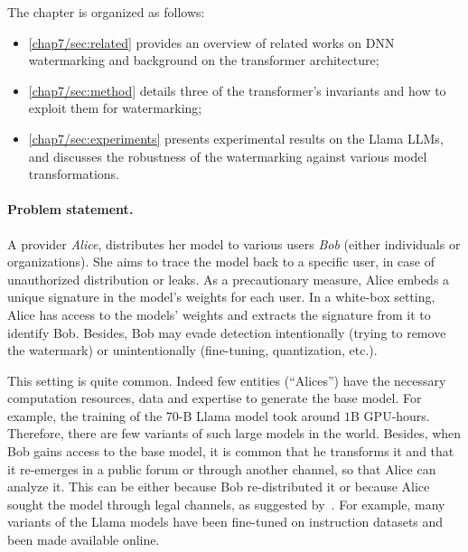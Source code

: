 The chapter is organized as follows:
\begin{itemize}
    \item 
    \autoref{chap7/sec:related} provides an overview of related works on DNN watermarking and background on the transformer architecture;
    \item
    \autoref{chap7/sec:method} details three of the transformer's invariants and how to exploit them for watermarking;
    \item
    \autoref{chap7/sec:experiments} presents experimental results on the Llama LLMs, and discusses the robustness of the watermarking against various model transformations.
\end{itemize}

\paragraph*{Problem statement.}
A provider \emph{Alice}, distributes her model to various users \emph{Bob} (either individuals or organizations).
She aims to trace the model back to a specific user, in case of unauthorized distribution or leaks. 
As a precautionary measure, Alice embeds a unique signature in the model's weights for each user. 
In a white-box setting, Alice has access to the models' weights and extracts the signature from it to identify Bob.
Besides, Bob may evade detection intentionally (trying to remove the watermark) or unintentionally (fine-tuning, quantization, etc.).

This setting is quite common. 
Indeed few entities (``Alices'') have the necessary computation resources, data and expertise to generate the base model. 
For example, the training of the 70-B Llama model took around $1$B GPU-hours.
Therefore, there are few variants of such large models in the world. 
Besides, when Bob gains access to the base model, it is common that he transforms it and that it re-emerges in a public forum or through another channel, so that Alice can analyze it. 
This can be either because Bob re-distributed it or because Alice sought the model through legal channels, as suggested by~\citet{fan2021deepip}.
For example, many variants of the Llama models have been fine-tuned on instruction datasets and been made available online.

